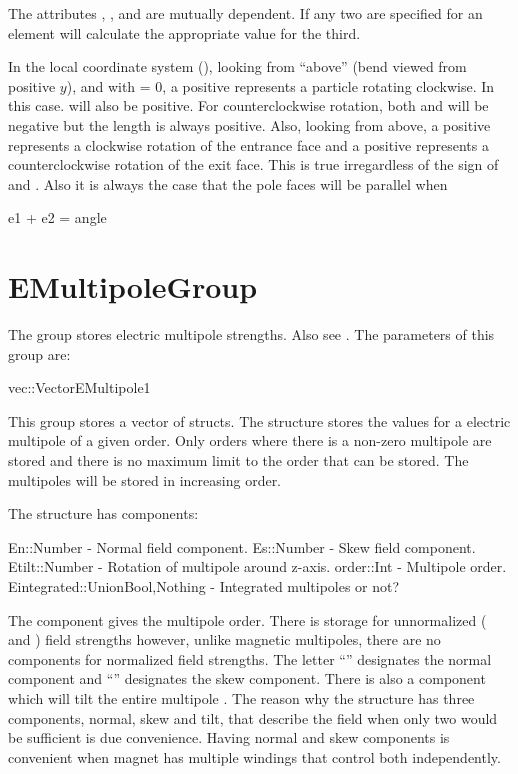 
The attributes , , and  are mutually dependent. If any two are specified for
an element \accellat will calculate the appropriate value for the third.

In the local coordinate system (), looking from ``above'' (bend viewed from positive
$y$), and with  = 0, a positive  represents a particle rotating clockwise. In
this case.  will also be positive. For counterclockwise rotation, both  and 
will be negative but the length  is always positive. Also, looking from above, a positive
 represents a clockwise rotation of the entrance face and a positive  represents a
counterclockwise rotation of the exit face. This is true irregardless of the sign of  and
. Also it is always the case that the pole faces will be parallel when
\begin{example}
  e1 + e2 = angle
\end{example}

\section{EMultipoleGroup}
\label{s:emultipole.g}

The  group stores electric multipole strengths. Also see .
The parameters of this group are:
\begin{example}
  vec::Vector{EMultipole1}
\end{example}
This group stores a vector of  structs.
The  structure stores the values for a electric multipole of a given order.
Only orders where there is a non-zero multipole are stored and there is no maximum limit to the 
order that can be stored. The multipoles will be stored in increasing order.

The  structure has components:
\begin{example}
  En::Number     - Normal field component.
  Es::Number     - Skew field component.
  Etilt::Number  - Rotation of multipole around z-axis.
  order::Int     - Multipole order.
  Eintegrated::Union{Bool,Nothing} - Integrated multipoles or not? 
\end{example}
The  component gives the multipole order.
There is storage for unnormalized ( and ) field strengths however, unlike magnetic
multipoles, there are no components for normalized field strengths. 
The letter ``'' designates the normal component and ``'' designates the skew component. 
There is also a  component which will tilt the entire multipole \cite{???}.
The reason why the structure has three components, 
normal, skew and tilt, that describe the field when only two would be sufficient is due convenience.
Having normal and skew components is convenient when magnet has multiple windings that control
both independently.

